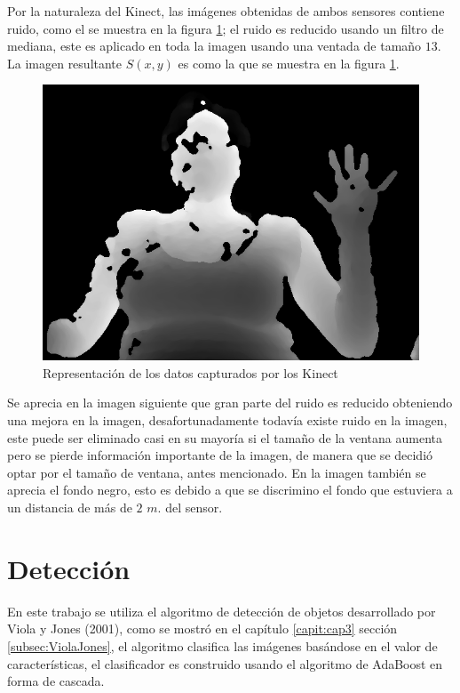 Por la naturaleza del Kinect, las imágenes obtenidas de ambos sensores contiene ruido, como el se muestra en la figura \ref{fig:ImagenCapturadaNoNoise}; el ruido es reducido usando un filtro de mediana, este es aplicado en toda la imagen usando una ventada de tamaño $13$. La imagen resultante $S(x,y)$ es como la que se muestra en la figura \ref{fig:ImagenCapturadaNoNoise}.\\ 
\begin{figure}[h!]
\begin{center}
\includegraphics[scale=.5]{./Figures/166_W13.png}
\end{center}
\caption{Representación de los datos capturados por los Kinect}
\label{fig:ImagenCapturadaNoNoise}
\end{figure}  
Se aprecia en la imagen siguiente  que gran parte del ruido es reducido obteniendo una mejora en la imagen, desafortunadamente todavía existe ruido en la imagen, este puede ser eliminado casi en su mayoría  si el tamaño de la ventana aumenta pero se pierde información importante de la imagen, de manera que se decidió optar por el tamaño de ventana, antes mencionado. En la imagen también se aprecia el fondo negro, esto es debido a que se discrimino el fondo que estuviera a un distancia de más de $2$ $m.$ del sensor. 



\section{Detección}\label{sec:DeteccionSystem} 

En este trabajo se utiliza el algoritmo de detección de objetos desarrollado por Viola y Jones (2001), como se mostró en el cap\'itulo \ref{capit:cap3} sección \ref{subsec:ViolaJones}, el algoritmo clasifica las imágenes basándose en el valor de características, el clasificador es construido usando el algoritmo de AdaBoost en forma de cascada. 


